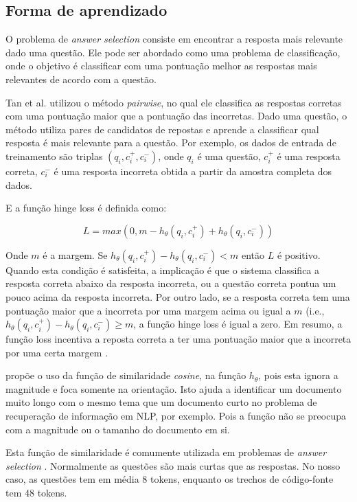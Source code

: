 \documentclass[12pt]{article}
\begin{document}
\subsection{Forma de aprendizado}

O problema de \textit{answer selection} consiste em encontrar a resposta mais relevante dado uma questão. Ele pode ser abordado como uma problema de classificação, onde
o objetivo é classificar com uma pontuação melhor as respostas mais relevantes de acordo com a questão.

Tan et al. utilizou o método \textit{pairwise}, no qual ele classifica as respostas corretas com uma pontuação maior que a pontuação das incorretas. Dado uma questão,
o método utiliza pares de candidatos de repostas e aprende a classificar qual resposta é mais relevante para a questão. Por exemplo, os dados de entrada de treinamento
são triplas $(q_{i}, c_{i}^{+}, c_{i}^{-})$, onde $q_{i}$ é uma questão, $c_{i}^{+}$ é uma resposta correta, $c_{i}^{-}$ é uma resposta incorreta obtida a partir da amostra completa dos dados. 

E a função hinge loss é definida como:

\begin{equation}
L = max(0, m - h_{\theta}(q_{i}, c_{i}^{+}) + h_{\theta}(q_{i}, c_{i}^{-}))   
\end{equation}


Onde $m$ é a margem. Se $h_{\theta}(q_{i}, c_{i}^{+}) - h_{\theta}(q_{i}, c_{i}^{-}) < m$ então $L$ é positivo. Quando esta condição é satisfeita, a implicação é que o sistema classifica a resposta correta abaixo da resposta incorreta, ou a questão correta pontua um pouco acima da resposta incorreta. Por outro lado, se a resposta correta tem uma pontuação maior que a incorreta por uma margem acima ou igual a $m$ (i.e., $h_{\theta}(q_{i}, c_{i}^{+}) - h_{\theta}(q_{i}, c_{i}^{-}) \geq m$, a função hinge loss é igual a zero. Em resumo, a função loss incentiva a reposta correta a ter uma pontuação maior que a incorreta por uma certa margem \cite{lai-etal-2018-review}.

\cite{tan-lstm-qa} propõe o uso da função de similaridade \textit{cosine}, na função $h_{\theta}$, pois esta ignora a magnitude e foca somente na orientação.
Isto ajuda a identificar um documento muito longo com o mesmo tema que um documento curto no problema de recuperação de informação em NLP, por exemplo. Pois a função não se preocupa
com a magnitude ou o tamanho do documento em si. 

Esta função de similaridade é comumente utilizada em problemas de \textit{answer selection} \cite{feng-answer-selection-2015}. Normalmente as questões são mais curtas que as respostas. No nosso caso, as questões tem em média 8 tokens, enquanto os trechos de código-fonte tem 48 tokens.
\end{document}
